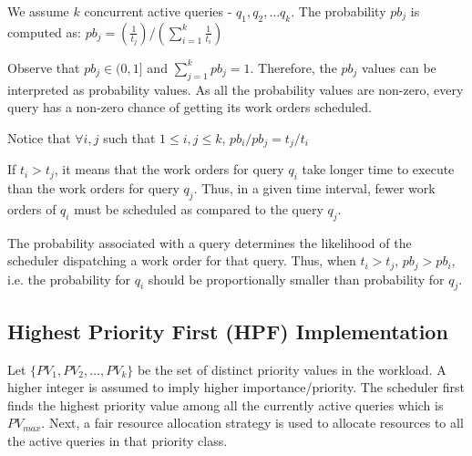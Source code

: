 
We assume $k$ concurrent active queries - $q_{1}, q_{2}, \ldots q_{k}$. 
The probability $pb_{j}$ is computed as:
$pb_{j} = (\frac{1}{t_{j}})/(\sum\limits_{i=1}^{k}\frac{1}{t_{i}})$

Observe that $pb_{j} \in (0, 1]$ and $\sum\limits_{j=1}^{k}pb_{j} = 1$. 
Therefore, the $pb_{j}$ values can be interpreted as probability values. 
As all the probability values are non-zero, every query has a non-zero chance of getting its work orders scheduled. 

Notice that $\forall i, j$ such that $1 \leq i, j \leq k$, 
$pb_{i}/pb_{j} = t_{j}/t_{i}$

If $t_{i} > t_{j}$, it means that the work orders for query $q_{i}$ take longer time to execute than the work orders for query $q_{j}$. 
Thus, in a given time interval, fewer work orders of $q_{i}$ must be scheduled as compared to the query $q_{j}$. %

The probability associated with a query determines the likelihood of the scheduler dispatching a work order for that query.
Thus, when $t_i > t_j$, $pb_j > pb_i$, i.e.  the probability for $q_{i}$ should be proportionally smaller than probability for $q_{j}$.

\subsection{Highest Priority First (HPF) Implementation}\label{ssec:hpf}
Let $\{PV_{1}, PV_{2}, \ldots, PV_{k}\}$ be the set of distinct priority values in the 
workload. 
A higher integer is assumed to imply higher importance/priority.
The scheduler first finds the highest priority value among all the currently active queries 
which is $PV_{max}$. %
Next, a fair resource allocation strategy is used to allocate resources to all the active queries in that priority class. 

